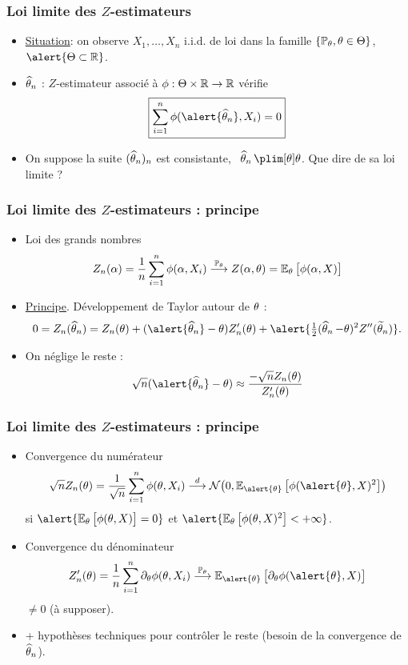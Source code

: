 \begin{frame}
\frametitle{Loi limite des $Z$-estimateurs}
\begin{itemize}
\item \underline{Situation}: on observe $X_1,\ldots, X_n$ i.i.d. de loi dans la famille $\{\operatorname{{\mathbb P}}_\theta, \theta \in \Theta\}$, $\alert{\Theta \subset \R}$.
\item \alert{ $\operatorname{\widehat \theta_{\mathnormal{n}}}$} : $Z$-estimateur \alert{associé à} $\phi:\Theta \times \operatorname{{\mathbb R}} \rightarrow \operatorname{{\mathbb R}}$ vérifie
$$\boxed{\sum_{i = 1}^n \phi(\alert{\est},X_i)=0}$$
\item On suppose la suite $(\operatorname{\widehat \theta_{\mathnormal{n}}})_n$ est \alert{consistante}, \ie\ $\est \plim[\theta] \theta$.  \alert{ Que dire de sa loi limite} ?
\end{itemize}
\end{frame}

\begin{frame}
\frametitle{Loi limite des $Z$-estimateurs : principe}
\begin{itemize}
\item \alert{ Loi des grands nombres}$$Z_n(\alpha)=\frac{1}{n}\sum_{i = 1}^n \phi(\alpha,X_i) \stackrel{\operatorname{{\mathbb P}}_\theta}{\longrightarrow} Z(\alpha,\theta) = \operatorname{{\mathbb E}}_\theta\big[\phi(\alpha,X)\big]$$
\item \underline{Principe}. Développement de Taylor autour de $\theta$ :
$$0 = Z_n(\est) = Z_n(\truetheta)+(\alert{\est}-\truetheta)Z_n'(\truetheta)+\alert{\tfrac{1}{2}(\est-\truetheta)^2Z''(\widetilde \truetheta_n)}.$$
\item On \alert{ néglige} le reste :
$$\sqrt{n}(\alert{\est}-\truetheta) \approx \frac{-\sqrt{n}Z_n(\truetheta)}{Z_n'(\truetheta)}$$
\end{itemize}
\end{frame}

\begin{frame}
\frametitle{Loi limite des $Z$-estimateurs : principe}
\begin{itemize}
\item Convergence du \alert{ numérateur}
$$\sqrt{n}Z_n(\truetheta) = \frac{1}{\sqrt{n}}\sum_{i = 1}^n\phi(\truetheta,X_i) \stackrel{d}{\longrightarrow} {\mathcal N}\big(0,\E_ {\alert{\truetheta}}\big[\phi(\alert{\truetheta},X)^2\big]\big)$$
si $\alert{\E_\truetheta\big[\phi(\truetheta,X)\big]=0}$ et $\alert{\E_\truetheta\big[\phi(\truetheta,X)^2\big]<+\infty}$.
\item Convergence du \alert{ dénominateur} $$Z'_n(\truetheta) = \frac{1}{n}\sum_{i = 1}^n\partial_\truetheta \phi(\truetheta,X_i) \stackrel{\PP_\truetheta}{\longrightarrow}
\E_{\alert{\truetheta}}\big[\partial_\truetheta \phi(\alert{\truetheta},X)\big]$$
\alert{ $\neq 0$ (à supposer)}.
\item + hypothèses techniques pour \alert{ contrôler le reste} (besoin de la convergence de $\operatorname{\widehat \theta_{\mathnormal{n}}}$).
\end{itemize}
\end{frame}

